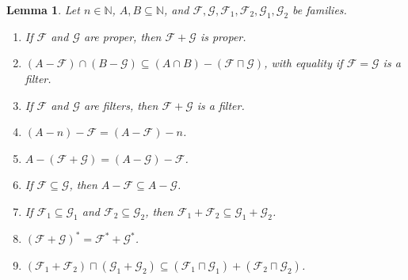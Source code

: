 \documentclass[letter,11pt]{article}
\theoremstyle{plain}
\newtheorem{lemma}[theorem]{Lemma}
\theoremstyle{definition}
\theoremstyle{plain}
\theoremstyle{plain}
\numberwithin{equation}{section}
\newcommand{\N}{\mathbb{N}}
\newcommand{\filter}{\mathscr{F}}
\newcommand{\filtertwo}{\mathscr{G}}
\newcommand{\classcap}{\sqcap}
\newcommand{\family}{\mathscr{F}}
\newcommand{\familyone}{\mathscr{F}}
\newcommand{\familytwo}{\mathscr{G}}
\begin{document}
\begin{lemma}
    \label{lemma_filter_algebra}
    \label{lemma_fam_dual_sums}
    \label{lemma_filter_sums_containment}
    Let $n \in \N$, $A, B \subseteq \N$, and $\filter, \filtertwo, \filter_1, \filter_2, \filtertwo_1, \filtertwo_2$ be families.
    \begin{enumerate}
        \item
        \label{item_family_prop_zero}
        If $\filter$ and $\filtertwo$ are proper, then $\filter + \filtertwo$ is proper.
        
        \item
        \label{item_family_prop_one_new}
        $(A - \filter) \cap (B - \filtertwo) \subseteq (A \cap B) - (\filter \classcap \filtertwo)$, with equality if $\filter = \filtertwo$ is a filter.

        \item \label{item_family_prop_two}
        If $\filter$ and $\filtertwo$ are filters, then $\filter + \filtertwo$ is a filter.

        \item \label{item_family_prop_three}
        $(A -n) - \filter = (A - \filter) - n$.

        \item \label{item_family_prop_four}
        $A - (\filter + \filtertwo) = (A - \filtertwo) - \filter$.

        \item \label{item_family_diff_containment}
        If $\family \subseteq \familytwo$, then $A - \family \subseteq A - \familytwo$.
        
        \item \label{item_filter_sums_containment}
        If $\filter_1 \subseteq \filtertwo_1$ and $\filter_2 \subseteq \filtertwo_2$, then $\filter_1 + \filter_2 \subseteq \filtertwo_1 + \filtertwo_2$.

        \item \label{item_sum_dual}
        $(\familyone + \familytwo)^* = \familyone^* + \familytwo^*$.

        \item \label{item_cap_sums}
        $(\familyone_1 + \familyone_2) \classcap (\familytwo_1 + \familytwo_2) \subseteq (\familyone_1 \classcap \familytwo_1) + (\familyone_2 \classcap \familytwo_2)$.
    \end{enumerate}
\end{lemma}
\end{document}
